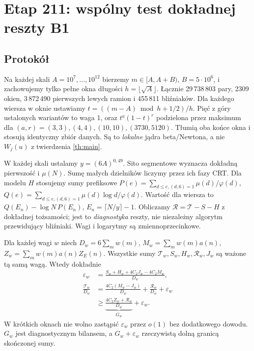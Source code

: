 \documentclass[11pt,a4paper]{article}
\newcommand{\R}{\mathcal R}
\newcommand{\T}{\mathcal T}
\begin{document}
\section{Etap 211: wspólny test dokładnej reszty B1}
\subsection{Protokół}
Na każdej skali $A=10^7,\dots,10^{12}$ bierzemy $m\in[A,A+B)$, $B=5\cdot10^6$, i zachowujemy tylko pełne okna długości $h=\lfloor\sqrt A\rfloor$. Łącznie 29\,738\,803 pary, 2309 okien, 3\,872\,490 pierwszych lewych ramion i 455\,811 bliźniaków. Dla każdego wiersza w oknie ustawiamy $t=((m-A)\bmod h+1/2)/h$. Pięć z góry ustalonych wariantów to waga 1, oraz $t^a(1-t)^r$ podzielona przez maksimum dla $(a,r)=(3,3),(4,4),(10,10),(3730,5120)$. Tłumią oba końce okna i stosują identyczny zbiór danych. Są to \emph{lokalne} jądra beta/Newtona, a nie $W_j(u)$ z twierdzenia \ref{th:main}.

W każdej skali ustalamy $y=(6A)^{0{,}49}$. Sito segmentowe wyznacza dokładną pierwszość i $\mu(N)$. Sumę małych dzielników liczymy przez ich fazy CRT. Dla modelu $H$ stosujemy sumy prefiksowe $P(e)=\sum_{d\le e,(d,6)=1}\mu(d)/\varphi(d)$, $Q(e)=\sum_{d\le e,(d,6)=1}\mu(d)\log d/\varphi(d)$. Wartość dla wiersza to $Q(E_n)-\log N\,P(E_n)$, $E_n=\lceil N/y\rceil-1$. Obliczamy $\R=\T-S-H$ z dokładnej tożsamości; jest to \emph{diagnostyka} reszty, nie niezależny algorytm przewidujący bliźniaki. Wagi i logarytmy są zmiennoprzecinkowe.

Dla każdej wagi $w$ niech $D_w=6\sum_m w(m)$, $M_w=\sum_m w(m)a(n)$, $Z_w=\sum_m w(m)a(n)Z_E(n)$. Wszystkie sumy $\T_w,S_w,H_w,\R_w,J_w$ są ważone tą samą wagą. Wtedy dokładnie
\begin{align*}
 \varepsilon_w&=\frac{S_w+H_w+4C_2J_w-4C_2M_w}{D_w},\\
 \frac{\T_w}{D_w}&=\frac{4C_2(M_w-J_w)}{D_w}+\frac{\R_w}{D_w}+\varepsilon_w\\
 &\ge\underbrace{\frac{4C_2 Z_w+\R_w}{D_w}}_{G_w}+\varepsilon_w.
\end{align*}
W krótkich oknach nie wolno zastąpić $\varepsilon_w$ przez $o(1)$ bez dodatkowego dowodu. $G_w$ jest diagnostycznym bilansem, a $G_w+\varepsilon_w$ rzeczywistą dolną granicą skończonej sumy.
\end{document}
